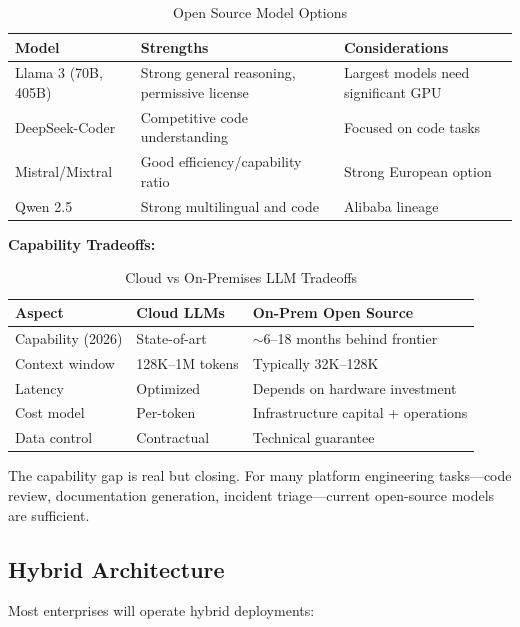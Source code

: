 \begin{table}[htbp]
\centering
\caption{Open Source Model Options}
\label{tab:open-source-models}
\begin{tabular}{lll}
\toprule
\textbf{Model} & \textbf{Strengths} & \textbf{Considerations} \\
\midrule
Llama 3 (70B, 405B) & Strong general reasoning, permissive license & Largest models need significant GPU \\
DeepSeek-Coder & Competitive code understanding & Focused on code tasks \\
Mistral/Mixtral & Good efficiency/capability ratio & Strong European option \\
Qwen 2.5 & Strong multilingual and code & Alibaba lineage \\
\bottomrule
\end{tabular}
\end{table}

\textbf{Capability Tradeoffs:}

\begin{table}[htbp]
\centering
\caption{Cloud vs On-Premises LLM Tradeoffs}
\label{tab:cloud-vs-onprem}
\begin{tabular}{lll}
\toprule
\textbf{Aspect} & \textbf{Cloud LLMs} & \textbf{On-Prem Open Source} \\
\midrule
Capability (2026) & State-of-art & $\sim$6--18 months behind frontier \\
Context window & 128K--1M tokens & Typically 32K--128K \\
Latency & Optimized & Depends on hardware investment \\
Cost model & Per-token & Infrastructure capital + operations \\
Data control & Contractual & Technical guarantee \\
\bottomrule
\end{tabular}
\end{table}

The capability gap is real but closing. For many platform engineering tasks---code review, documentation generation, incident triage---current open-source models are sufficient.

\subsection{Hybrid Architecture}
\label{subsec:hybrid-architecture}

Most enterprises will operate hybrid deployments:

